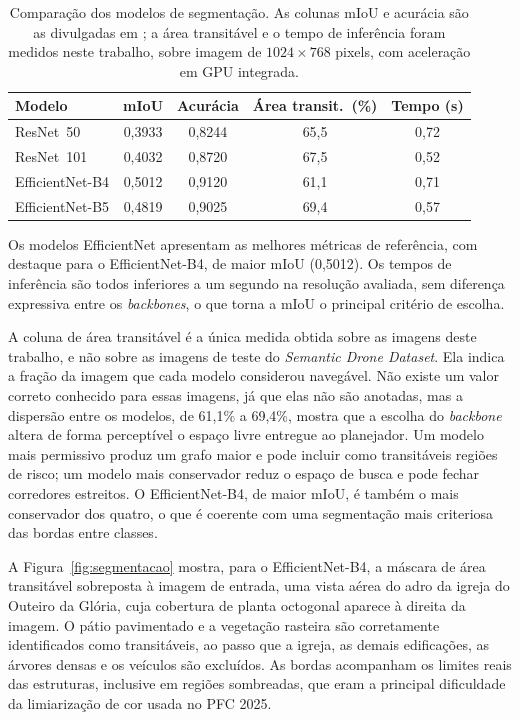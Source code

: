 \documentclass[
    12pt,
    openright,
    oneside,
    a4paper,
    english,
    brazil
]{abntex2}
\begin{document}
\begin{table}[H]
    \centering
    \caption{Comparação dos modelos de segmentação. As colunas mIoU e acurácia são as divulgadas em \cite{junior2024_models}; a área transitável e o tempo de inferência foram medidos neste trabalho, sobre imagem de $1024 \times 768$ pixels, com aceleração em GPU integrada.}
    \label{tab:comparacao_modelos}
    \begin{tabular}{lcccc}
        \toprule
        \textbf{Modelo} & \textbf{mIoU} & \textbf{Acurácia} & \textbf{Área transit.\ (\%)} & \textbf{Tempo (s)} \\
        \midrule
        ResNet~50        & 0,3933 & 0,8244 & 65,5 & 0,72 \\
        ResNet~101       & 0,4032 & 0,8720 & 67,5 & 0,52 \\
        EfficientNet-B4  & 0,5012 & 0,9120 & 61,1 & 0,71 \\
        EfficientNet-B5  & 0,4819 & 0,9025 & 69,4 & 0,57 \\
        \bottomrule
    \end{tabular}
\end{table}

Os modelos EfficientNet apresentam as melhores métricas de referência, com destaque para o EfficientNet-B4, de maior mIoU (0,5012). Os tempos de inferência são todos inferiores a um segundo na resolução avaliada, sem diferença expressiva entre os \textit{backbones}, o que torna a mIoU o principal critério de escolha.

A coluna de área transitável é a única medida obtida sobre as imagens deste trabalho, e não sobre as imagens de teste do \emph{Semantic Drone Dataset}. Ela indica a fração da imagem que cada modelo considerou navegável. Não existe um valor correto conhecido para essas imagens, já que elas não são anotadas, mas a dispersão entre os modelos, de 61,1\% a 69,4\%, mostra que a escolha do \textit{backbone} altera de forma perceptível o espaço livre entregue ao planejador. Um modelo mais permissivo produz um grafo maior e pode incluir como transitáveis regiões de risco; um modelo mais conservador reduz o espaço de busca e pode fechar corredores estreitos. O EfficientNet-B4, de maior mIoU, é também o mais conservador dos quatro, o que é coerente com uma segmentação mais criteriosa das bordas entre classes.

A Figura~\ref{fig:segmentacao} mostra, para o EfficientNet-B4, a máscara de área transitável sobreposta à imagem de entrada, uma vista aérea do adro da igreja do Outeiro da Glória, cuja cobertura de planta octogonal aparece à direita da imagem. O pátio pavimentado e a vegetação rasteira são corretamente identificados como transitáveis, ao passo que a igreja, as demais edificações, as árvores densas e os veículos são excluídos. As bordas acompanham os limites reais das estruturas, inclusive em regiões sombreadas, que eram a principal dificuldade da limiarização de cor usada no PFC 2025.
\end{document}
